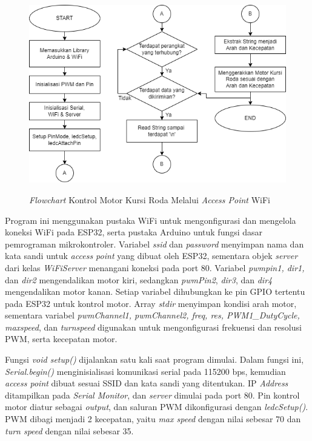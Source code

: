 \begin{figure}[H]
\centering
\includegraphics[scale=0.5]{gambar/bab3/8. Kontrol Motor WiFi.png}
\caption{\emph{Flowchart} Kontrol Motor Kursi Roda Melalui \emph{Access Point} WiFi}
\label{fig:Flowchart 8 Kontrol WiFi}
\parencite{ekatama2024perancangan}
\end{figure}

Program ini menggunakan pustaka WiFi untuk mengonfigurasi dan mengelola koneksi WiFi pada ESP32, serta pustaka Arduino untuk fungsi dasar pemrograman mikrokontroler. Variabel \emph{ssid} dan \emph{password} menyimpan nama dan kata sandi untuk \emph{access point} yang dibuat oleh ESP32, sementara objek \emph{server} dari kelas \emph{WiFiServer} menangani koneksi pada port 80. Variabel \emph{pwmpin1, dir1,} dan \emph{dir2} mengendalikan motor kiri, sedangkan \emph{pwmPin2}, \emph{dir3}, dan \emph{dir4} mengendalikan motor kanan. Setiap variabel dihubungkan ke pin GPIO tertentu pada ESP32 untuk kontrol motor. Array \emph{stdir} menyimpan kondisi arah motor, sementara variabel \emph{pwmChannel1, pwmChannel2, freq, res, PWM1\_DutyCycle, maxspeed}, dan \emph{turnspeed} digunakan untuk mengonfigurasi frekuensi dan resolusi PWM, serta kecepatan motor.

Fungsi \emph{void setup()} dijalankan satu kali saat program dimulai. Dalam fungsi ini, \emph{Serial.begin()} menginisialisasi komunikasi serial pada 115200 bps, kemudian \emph{access point} dibuat sesuai SSID dan kata sandi yang ditentukan. IP \emph{Address} ditampilkan pada \emph{Serial Monitor}, dan \emph{server} dimulai pada port 80. Pin kontrol motor diatur sebagai \emph{output}, dan saluran PWM dikonfigurasi dengan \emph{ledcSetup()}. PWM dibagi menjadi 2 kecepatan, yaitu \emph{max speed} dengan nilai sebesar 70 dan \emph{turn speed} dengan nilai sebesar 35.

